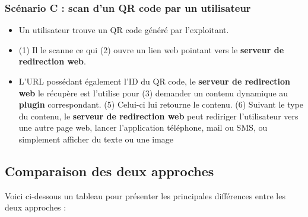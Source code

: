 \documentclass[a4paper,12pt]{article}
\begin{document}
\subsubsection{Scénario C : scan d'un QR code par un utilisateur}

\begin{itemize}
  
 \item Un utilisateur trouve un QR code généré par l'exploitant.
 \item (1) Il le scanne ce qui (2) ouvre un lien web pointant vers le \textbf{serveur de redirection web}.
 \item L'URL possédant également l'ID du QR code, le \textbf{serveur de redirection web} le récupère est l'utilise pour (3) demander un contenu dynamique au \textbf{plugin} correspondant. (5) Celui-ci lui retourne le contenu. (6) Suivant le type du contenu, le \textbf{serveur de redirection web} peut rediriger l'utilisateur vers une autre page web, lancer l'application téléphone, mail ou SMS, ou simplement afficher du texte ou une image
  
\end{itemize}

%


\subsection{Comparaison des deux approches}
\label{compApproches}

\noindent Voici ci-dessous un tableau pour présenter les principales différences entre les deux approches :\\
\end{document}
